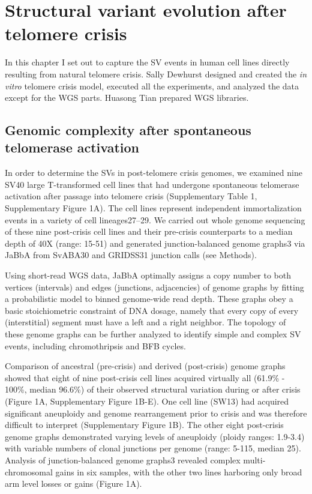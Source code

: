 \documentclass[phd,tocprelim]{cornell}
\begin{document}
\chapter{Structural variant evolution after telomere crisis} \label{chap:4}
In this chapter I set out to capture the SV events in human cell lines directly resulting from natural telomere crisis. Sally Dewhurst designed and created the \textit{in vitro} telomere crisis model, executed all the experiments, and analyzed the data except for the WGS parts. Huasong Tian prepared WGS libraries.


\section{Genomic complexity after spontaneous telomerase activation}
In order to determine the SVs in post-telomere crisis genomes, we examined nine SV40 large T-transformed cell lines that had undergone spontaneous telomerase activation after passage into telomere crisis (Supplementary Table 1, Supplementary Figure 1A). The cell lines represent independent immortalization events in a variety of cell lineages27–29. We carried out whole genome sequencing of these nine post-crisis cell lines and their pre-crisis counterparts to a median depth of 40X (range: 15-51) and generated junction-balanced genome graphs3 via JaBbA from SvABA30 and GRIDSS31 junction calls (see Methods).  

Using short-read WGS data, JaBbA optimally assigns a copy number to both vertices (intervals) and edges (junctions, adjacencies) of genome graphs by fitting a probabilistic model to binned genome-wide read depth. These graphs obey a basic stoichiometric constraint of DNA dosage, namely that every copy of every (interstitial) segment must have a left and a right neighbor. The topology of these genome graphs can be further analyzed to identify simple and complex SV events, including chromothripsis and BFB cycles. 

Comparison of ancestral (pre-crisis) and derived (post-crisis) genome graphs showed that eight of nine post-crisis cell lines acquired virtually all (61.9\% - 100\%, median 96.6\%) of their observed structural variation during or after crisis (Figure 1A, Supplementary Figure 1B-E). One cell line (SW13) had acquired significant aneuploidy and genome rearrangement prior to crisis and was therefore difficult to interpret (Supplementary Figure 1B). The other eight post-crisis genome graphs demonstrated varying levels of aneuploidy (ploidy ranges: 1.9-3.4) with variable numbers of clonal junctions per genome (range: 5-115, median 25). Analysis of junction-balanced genome graphs3 revealed complex multi-chromosomal gains in six samples, with the other two lines harboring only broad arm level losses or gains (Figure 1A).
\end{document}

